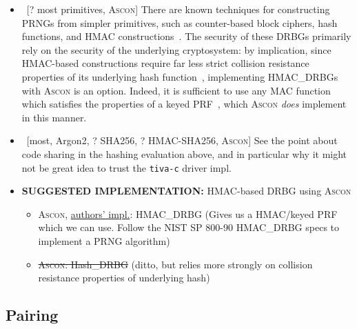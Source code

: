 \begin{itemize}
\begin{itemize}
        \item\ [\cmark? most primitives, \cmark A\textsc{scon}] There are known techniques for constructing PRNGs from simpler primitives, such as counter-based block ciphers, hash functions, and HMAC constructions~\cite{NIST-DRBG}. The security of these DRBGs primarily rely on the security of the underlying cryptosystem: by implication, since HMAC-based constructions require far less strict collision resistance properties of its underlying hash function~\cite{NIST-HMAC, NIST-HMAC-MD5}, implementing HMAC\_DRBGs with A\textsc{scon} is an option. Indeed, it is sufficient to use any MAC function which satisfies the properties of a keyed PRF~\cite{WISA:Hirose08}, which A\textsc{scon} \emph{does} implement in this manner.
        \item\ [\xmark most, \xmark Argon2, \cmark? SHA256, \cmark? HMAC-SHA256, \cmark A\textsc{scon}] See the point about code sharing in the hashing evaluation above, and in particular why it might not be great idea to trust the \texttt{tiva-c} driver impl.
        \item \textbf{SUGGESTED IMPLEMENTATION:} HMAC-based DRBG using A\textsc{scon}
        \begin{itemize}
            \item A\textsc{scon}, \href{https://github.com/ascon/ascon-c}{authors' impl.}: HMAC\_DRBG (Gives us a HMAC/keyed PRF which we can use. Follow the NIST SP 800-90 HMAC\_DRBG specs to implement a PRNG algorithm)
            \item \st{A\textsc{scon}: Hash\_DRBG} (ditto, but relies more strongly on collision resistance properties of underlying hash)
        \end{itemize}
    \end{itemize}
\end{itemize}

\subsection{Pairing}

